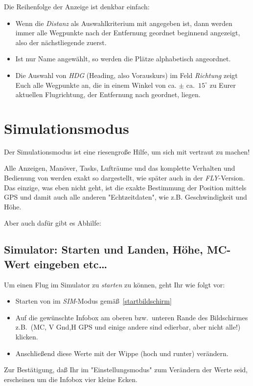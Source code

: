 Die Reihenfolge der Anzeige ist denkbar einfach:
\begin{itemize}\i
\item Wenn die \textsl{Distanz} als Auswahlkriterium mit angegeben ist, dann werden immer alle Wegpunkte nach der Entfernung geordnet beginnend angezeigt, also der nächstliegende zuerst.
\item Ist nur \textsf{Name} angewählt, so werden die Plätze alphabetisch angeordnet.
\item Die Auswahl von \textsl{HDG} (Heading, also Vorauskurs) im Feld \textsl{Richtung} zeigt Euch alle Wegpunkte an, die in einem Winkel von ca. $\pm$ ca.\ $15^\circ$ zu Eurer aktuellen Flugrichtung, der Entfernung nach geordnet, liegen.
\end{itemize}

\section{Simulationsmodus}\label{sim-mode}
Der Simulationsmodus ist eine riesengroße Hilfe, um sich mit \xc vertraut zu machen!

Alle Anzeigen, Manöver, Tasks, Lufträume und das komplette Verhalten und Bedienung von \xc werden exakt
so dargestellt, wie später auch in der \textsl{FLY}-Version. Das einzige, was eben nicht geht, ist die exakte Bestimmung der Position mittels GPS und damit auch alle anderen "Echtzeitdaten", wie z.B. Geschwindigkeit und Höhe.

Aber auch dafür gibt es Abhilfe:
\subsection{Simulator: Starten und Landen, Höhe, MC-Wert eingeben etc\dots }\label{SimStartenLanden}
Um einen Flug im Simulator zu \textit{starten} zu können, geht Ihr wie folgt vor:
\begin{itemize}
\item Starten von \xc im \textsl{SIM}-Modus gemäß~\ref{startbildschirm}
\item Auf die gewünschte Infobox  am oberen bzw.\ unteren Rande des Bildschirmes z.B.\ (\textsf{MC}, \textsf{V Gnd},\textsf{H  GPS} und einige andere sind edierbar, aber nicht alle!) klicken.
\item Anschließend diese Werte mit der Wippe (hoch und runter) verändern.
\end{itemize}
Zur Bestätigung, daß Ihr im "Einstellungsmodus" zum Verändern der Werte seid, erscheinen um die Infobox vier kleine Ecken.


